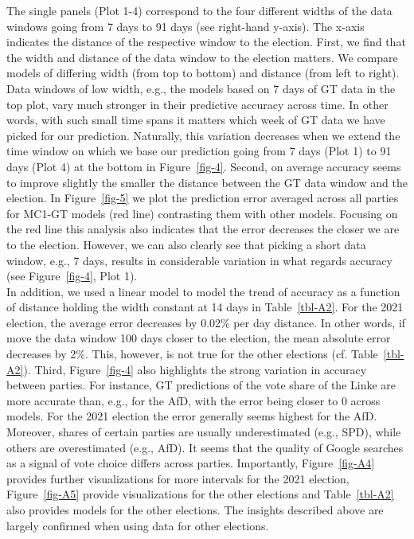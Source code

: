 \documentclass[
  letterpaper,
  DIV=11,
  numbers=noendperiod]{scrartcl}
\begin{document}
The single panels (Plot 1-4) correspond to the four different widths of
the data windows going from 7 days to 91 days (see right-hand y-axis).
The x-axis indicates the distance of the respective window to the
election. First, we find that the width and distance of the data window
to the election matters. We compare models of differing width (from top
to bottom) and distance (from left to right). Data windows of low width,
e.g., the models based on 7 days of GT data in the top plot, vary much
stronger in their predictive accuracy across time. In other words, with
such small time spans it matters which week of GT data we have picked
for our prediction. Naturally, this variation decreases when we extend
the time window on which we base our prediction going from 7 days (Plot
1) to 91 days (Plot 4) at the bottom in Figure~\ref{fig-4}. Second, on
average accuracy seems to improve slightly the smaller the distance
between the GT data window and the election. In Figure~\ref{fig-5} we
plot the prediction error averaged across all parties for MC1-GT models
(red line) contrasting them with other models. Focusing on the red line
this analysis also indicates that the error decreases the closer we are
to the election. However, we can also clearly see that picking a short
data window, e.g., 7 days, results in considerable variation in what
regards accuracy (see Figure~\ref{fig-4}, Plot 1).\\
In addition, we used a linear model to model the trend of accuracy as a
function of distance holding the width constant at 14 days in
Table~\ref{tbl-A2}. For the 2021 election, the average error decreases
by 0.02\% per day distance. In other words, if move the data window 100
days closer to the election, the mean absolute error decreases by 2\%.
This, however, is not true for the other elections (cf.
Table~\ref{tbl-A2}). Third, Figure~\ref{fig-4} also highlights the
strong variation in accuracy between parties. For instance, GT
predictions of the vote share of the Linke are more accurate than, e.g.,
for the AfD, with the error being closer to 0 across models. For the
2021 election the error generally seems highest for the AfD. Moreover,
shares of certain parties are usually underestimated (e.g., SPD), while
others are overestimated (e.g., AfD). It seems that the quality of
Google searches as a signal of vote choice differs across parties.
Importantly, Figure~\ref{fig-A4} provides further visualizations for
more intervals for the 2021 election, Figure~\ref{fig-A5} provide
visualizations for the other elections and Table~\ref{tbl-A2} also
provides models for the other elections. The insights described above
are largely confirmed when using data for other elections.
\end{document}
